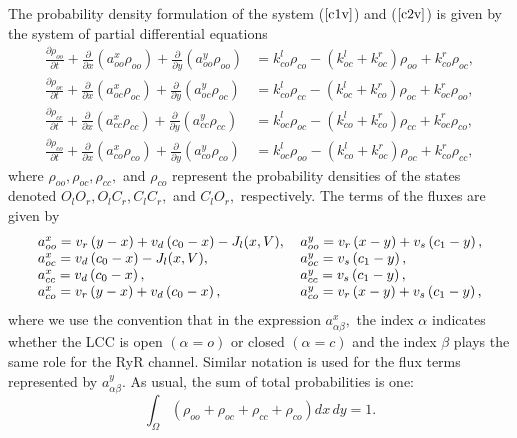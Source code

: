The probability density formulation of the system ($\ref{c1v}$) and ($\ref{c2v}$) is given by the
 system of partial differential equations
\begin{align}
\frac{\partial\rho_{oo}}{\partial t}+\frac{\partial}{\partial x}\left(
a_{oo}^{x}\rho_{oo}\right)  +\frac{\partial}{\partial y}\left(  a_{oo}^{y}%
\rho_{oo}\right)   &  =k_{co}^{l}\rho_{co}-\left(  k_{oc}^{l}+k_{oc}%
^{r}\right)  \rho_{oo}+k_{co}^{r}\rho_{oc},\label{eq:pdfoo}\\
\frac{\partial\rho_{oc}}{\partial t}+\frac{\partial}{\partial x}\left(
a_{oc}^{x}\rho_{oc}\right)  +\frac{\partial}{\partial y}\left(  a_{oc}^{y}%
\rho_{oc}\right)   &  =k_{co}^{l}\rho_{cc}-\left(  k_{oc}^{l}+k_{co}%
^{r}\right)  \rho_{oc}+k_{oc}^{r}\rho_{oo},\label{eq:pdfoc}\\
\frac{\partial\rho_{cc}}{\partial t}+\frac{\partial}{\partial x}\left(
a_{cc}^{x}\rho_{cc}\right)  +\frac{\partial}{\partial y}\left(  a_{cc}^{y}%
\rho_{cc}\right)   &  =k_{oc}^{l}\rho_{oc}-\left(  k_{co}^{l}+k_{co}%
^{r}\right)  \rho_{cc}+k_{oc}^{r}\rho_{co},\label{eq:pdfcc}\\
\frac{\partial\rho_{co}}{\partial t}+\frac{\partial}{\partial x}\left(
a_{co}^{x}\rho_{co}\right)  +\frac{\partial}{\partial y}\left(  a_{co}^{y}%
\rho_{co}\right)   &  =k_{oc}^{l}\rho_{oo}-\left(  k_{co}^{l}+k_{oc}%
^{r}\right)  \rho_{oc}+k_{co}^{r}\rho_{cc},\label{eq:pdfco}%
\end{align}
where $\rho_{oo},\rho_{oc},\rho_{cc},$ and $\rho_{co}$ represent the probability
densities of the states denoted 
$O_{l}O_{r},O_{l}C_{r},C_{l}C_{r},$ and $C_{l}O_{r},$ respectively. The terms of the fluxes are given by%
\[
\begin{tabular}
[c]{ll}%
$a_{oo}^{x}=v_{r}\left(  y-x\right)  +v_{d}\left(  c_{0}-x\right)
-J_{l}(x,V),$ & $a_{oo}^{y}=v_{r}\left(  x-y\right)  +v_{s}\left(
c_{1}-y\right),  $\\
$a_{oc}^{x}=v_{d}\left(  c_{0}-x\right) - J_{l}(x,V),$ &
$a_{oc}^{y}=v_{s}\left(  c_{1}-y\right),  $\\
$a_{cc}^{x}=v_{d}\left(  c_{0}-x\right),  $ & $a_{cc}^{y}=v_{s}\left(
c_{1}-y\right),  $\\
$a_{co}^{x}=v_{r}\left(  y-x\right)+v_{d}\left(  c_{0}-x\right),  $ & $a_{co}^{y}%
=v_{r}\left(  x-y\right)  +v_{s}\left(  c_{1}-y\right),  $%
\end{tabular}
\]
where we use the convention that in the expression $a_{\alpha\beta}%
^{x},$ the index $\alpha$ indicates whether the LCC is open
$(\alpha=o)$ or closed $(\alpha=c)$ and the index $\beta$ plays the same role
for the RyR channel. Similar notation is used for the flux terms represented by
$a_{\alpha\beta}^{y}.$ As usual, the sum of total probabilities is 
one:%
\begin{equation}
\int_{\Omega}\left(  \rho_{oo}+\rho_{oc}+\rho_{cc}+\rho_{co}\right)  dx\,dy=1. \label{sumone}
\end{equation}



